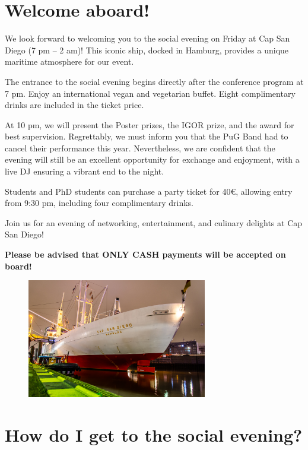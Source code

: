 
\setlength{\parskip}{1em}   

\section*{Welcome aboard!}

We look forward to welcoming you to the social evening on Friday at Cap San Diego (7 pm – 2 am)! This iconic ship, docked in Hamburg, provides a unique maritime atmosphere for our event.

The entrance to the social evening begins directly after the conference program at 7 pm. Enjoy an international vegan and vegetarian buffet. Eight complimentary drinks are included in the ticket price.

At 10 pm, we will present the Poster prizes, the IGOR prize, and the award for best supervision. Regrettably, we must inform you that the PuG Band had to cancel their performance this year. Nevertheless, we are confident that the evening will still be an excellent opportunity for exchange and enjoyment, with a live DJ ensuring a vibrant end to the night.

Students and PhD students can purchase a party ticket for 40€, allowing entry from 9:30 pm, including four complimentary drinks.

Join us for an evening of networking, entertainment, and culinary delights at Cap San Diego! 

\textbf{Please be advised that ONLY CASH payments will be accepted on board!}

\vspace*{1cm}

\begin{figure}[H]
	\centering
	\includegraphics[width=0.7\textwidth]{tex/images/social_event/social4.png}
\end{figure}

\newpage

\section*{How do I get to the social evening?}

